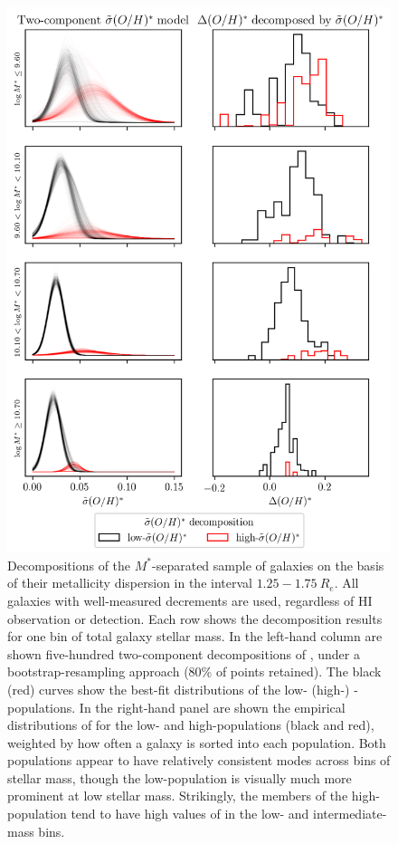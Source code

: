 \begin{figure}
    \centering
    \includegraphics{sigma2comp_dec01_subplotmstar}
    \caption[Two-component decompositions of stellar mass bins' distributions by their scatter of their metallicity distribution at fixed radius.]{\fixspacing Decompositions of the $M^*$-separated sample of galaxies on the basis of their metallicity dispersion in the interval $1.25-1.75 ~ R_e$. All galaxies with well-measured decrements are used, regardless of HI observation or detection. Each row shows the decomposition results for one bin of total galaxy stellar mass. In the left-hand column are shown five-hundred two-component decompositions of \metdisp, under a bootstrap-resampling approach (80\% of points retained). The black (red) curves show the best-fit distributions of the low- (high-) -\metdisp populations. In the right-hand panel are shown the empirical distributions of \metdec for the low- and high-\metdisp populations (black and red), weighted by how often a galaxy is sorted into each population. Both populations appear to have relatively consistent modes across bins of stellar mass, though the low-\metdisp population is visually much more prominent at low stellar mass. Strikingly, the members of the high-\metdisp population tend to have high values of \metdec in the low- and intermediate-mass bins.}
    \label{fig:decomposition}
\end{figure}

